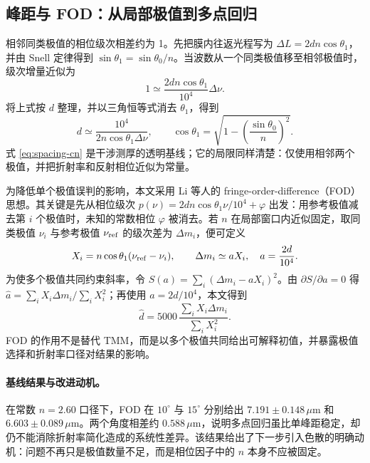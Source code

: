 \documentclass[10pt,a4paper]{ctexart}
\newcommand{\um}{\ensuremath{\mu\mathrm{m}}}
\begin{document}
\subsection{峰距与 FOD：从局部极值到多点回归}
相邻同类极值的相位级次相差约为 1。先把膜内往返光程写为 $\Delta L=2dn\cos\theta_1$，并由 Snell 定律得到 $\sin\theta_1=\sin\theta_0/n$。当波数从一个同类极值移至相邻极值时，级次增量近似为
\begin{equation}
1\simeq \frac{2dn\cos\theta_1}{10^4}\Delta\nu.
\end{equation}
将上式按 $d$ 整理，并以三角恒等式消去 $\theta_1$，得到
\begin{equation}
d\simeq\frac{10^4}{2n\cos\theta_1\Delta\nu},\qquad
\cos\theta_1=\sqrt{1-\left(\frac{\sin\theta_0}{n}\right)^2}.
\label{eq:spacing-cn}
\end{equation}
式 \eqref{eq:spacing-cn} 是干涉测厚的透明基线；它的局限同样清楚：仅使用相邻两个极值，并把折射率和反射相位近似为常量。

为降低单个极值误判的影响，本文采用 Li 等人的 fringe-order-difference（FOD）思想\cite{Li2010}。其关键是先从相位级次 $p(\nu)=2dn\cos\theta_1\nu/10^4+\varphi$ 出发：用参考极值减去第 $i$ 个极值时，未知的常数相位 $\varphi$ 被消去。若 $n$ 在局部窗口内近似固定，取同类极值 $\nu_i$ 与参考极值 $\nu_{\rm ref}$ 的级次差为 $\Delta m_i$，便可定义
\begin{equation}
X_i=n\cos\theta_1(\nu_{\rm ref}-\nu_i),\qquad
\Delta m_i\simeq aX_i,\quad a=\frac{2d}{10^4}.
\end{equation}
为使多个极值共同约束斜率，令 $S(a)=\sum_i(\Delta m_i-aX_i)^2$。由 $\partial S/\partial a=0$ 得 $\hat a=\sum_iX_i\Delta m_i/\sum_iX_i^2$；再使用 $a=2d/10^4$，本文得到
\begin{equation}
\hat d=5000\,\frac{\sum_iX_i\Delta m_i}{\sum_iX_i^2}.
\label{eq:fod-cn}
\end{equation}
FOD 的作用不是替代 TMM，而是以多个极值共同给出可解释初值，并暴露极值选择和折射率口径对结果的影响。

\paragraph{基线结果与改进动机。}
在常数 $n=2.60$ 口径下，FOD 在 $10^\circ$ 与 $15^\circ$ 分别给出 $7.191\pm0.148\,\um$ 和 $6.603\pm0.089\,\um$。两个角度相差约 $0.588\,\um$，说明多点回归虽比单峰距稳定，却仍不能消除折射率简化造成的系统性差异。该结果给出了下一步引入色散的明确动机：问题不再只是极值数量不足，而是相位因子中的 $n$ 本身不应被固定。
\end{document}
